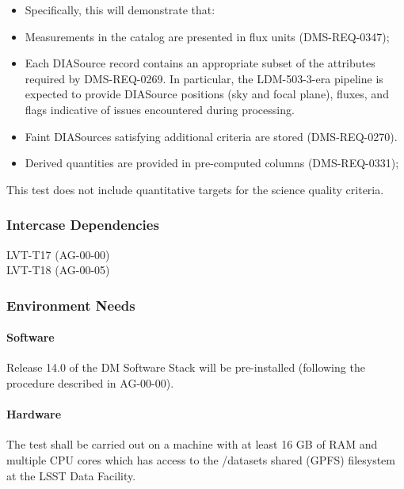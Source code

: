 \begin{itemize}
\tightlist
\item
  Specifically, this will demonstrate that:
\item
  Measurements in the catalog are presented in flux units
  (DMS-REQ-0347);
\item
  Each DIASource record contains an appropriate subset of the attributes
  required by DMS-REQ-0269. In particular, the LDM-503-3-era pipeline is
  expected to provide DIASource positions (sky and focal plane), fluxes,
  and flags indicative of issues encountered during processing.
\item
  Faint DIASources satisfying additional criteria are stored
  (DMS-REQ-0270).
\item
  Derived quantities are provided in pre-computed columns
  (DMS-REQ-0331);
\end{itemize}

This test does not include quantitative targets for the science quality
criteria.\\[2\baselineskip]





\subsubsection{Intercase Dependencies}

LVT-T17 (AG-00-00)\\
LVT-T18 (AG-00-05)



\subsubsection{Environment Needs}

\paragraph{Software}

Release 14.0 of the DM Software Stack will be pre-installed (following
the procedure described in AG-00-00).



\paragraph{Hardware}

The test shall be carried out on a machine with at least 16 GB of RAM
and multiple CPU cores which has access to the /datasets shared (GPFS)
filesystem at the LSST Data Facility.



